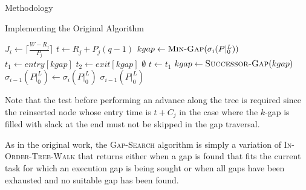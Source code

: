\documentclass{article}
\begin{document}
\begin{section}{Methodology}
\begin{subsection}{Implementing the Original Algorithm}
\begin{paragraph}{}
    \begin{algorithm}[H]
      \caption{Gap-Tranformation Algorithm\autocite[12]{BelwalCheng}}\label{gapxfrm1}
      \begin{algorithmic}[2]
          \State $J_{i} \gets \lceil\frac{W - R_{j}}{P_{j}}\rceil$
            \State $t \gets R_{j} + P_{j}(q-1)$
            \State $kgap \gets \Call{Min-Gap}{\sigma_{i}(P|_{0}^{L})}$
            \State $t_{1} \gets entry[kgap]$
            \State $t_{2} \gets exit[kgap]$
                \State \Return $\emptyset$
              \EndIf
                \State $t \gets t_{1}$
              \EndIf
                \State \Call{Gap-Delete}{$\sigma_{i}(P|_{0}^{L}), [t_{1},t_{2})$}
                  \State \Call{Gap-Insert}{$\sigma_{i}(P|_{0}^{L}), [t_{1},t)$}
                  \ExitWhile
                \EndIf
                  \State \Call{Gap-Insert}{$\sigma_{i}(P|_{0}^{L}), [t_{1},t)$}
                  \State \Call{Gap-Insert}{$\sigma_{i}(P|_{0}^{L}), [t + C_{j},t_{2})$}
                  \ExitWhile
                \EndIf
                  \State \Call{Gap-Insert}{$\sigma_{i}(P|_{0}^{L}), [t_{1},t)$}
                \EndIf
              \EndIf
                \State $kgap \gets \Call{Successor-Gap}{kgap}$
              \EndIf
            \EndWhile
          \EndFor
          \State $\sigma_{i-1}(P|_{0}^{L}) \gets \sigma_{i}(P|_{0}^{L})$
          \State \Return $\sigma_{i-1}(P|_{0}^{L})$
        \EndFunction
      \end{algorithmic}
    \end{algorithm}
    \end{paragraph}
    \begin{paragraph}{}
      Note that the test before performing an advance along the tree is required
      since the reinserted node whose entry time is $t + C_{j}$ in the case where
      the $k$-gap is filled with slack at the end must not be skipped in the gap traversal.
    \end{paragraph}
    \begin{paragraph}{}
      As in the original work, the \textsc{Gap-Search}\autocite[12-13]{BelwalCheng} algorithm is simply a variation of \textsc{In-Order-Tree-Walk}\autocite[245-246]{CLR}
      that returns either when a gap is found that fits the current task for which an execution gap is being sought
      or when all gaps have been exhausted and no suitable gap has been found.
    \end{paragraph}
  \end{subsection}


\end{section}
\end{document}
